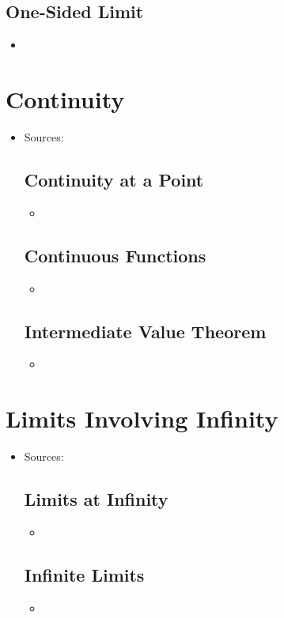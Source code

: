 \begin{itemize}
  \subsection{One-Sided Limit}
  \begin{itemize}
    \item 
  \end{itemize}
  
\end{itemize}

\section{Continuity}
\begin{itemize}
  \item Sources:
  
  \subsection{Continuity at a Point}
  \begin{itemize}
    \item 
  \end{itemize}

  \subsection{Continuous Functions}
  \begin{itemize}
    \item 
  \end{itemize}
  
  \subsection{Intermediate Value Theorem}
  \begin{itemize}
    \item 
  \end{itemize}
  
\end{itemize}

\section{Limits Involving Infinity}
\begin{itemize}
  \item Sources:

  \subsection{Limits at Infinity}
  \begin{itemize}
    \item 
  \end{itemize}

  \subsection{Infinite Limits}
  \begin{itemize}
    \item 
  \end{itemize}
  
  
\end{itemize}






